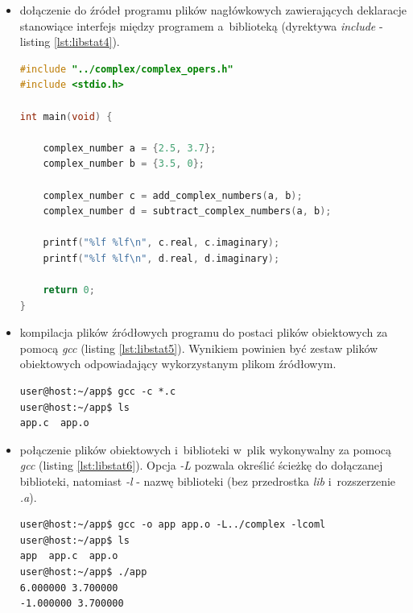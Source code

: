 \begin{itemize}
\item dołączenie do źródeł programu plików nagłówkowych zawierających deklaracje stanowiące interfejs między programem a~biblioteką (dyrektywa \textit{include} - listing \ref{lst:libstat4}).

\begin{lstlisting}[language=c++, caption={Plik \textit{app.c} zawierający dyrektywę \textit{include} dołączającą plik nagłówkowy zawierający deklaracje funkcji z~biblioteki statycznej},label={lst:libstat4}]
#include "../complex/complex_opers.h"
#include <stdio.h>

int main(void) {

    complex_number a = {2.5, 3.7};
    complex_number b = {3.5, 0};

    complex_number c = add_complex_numbers(a, b);
    complex_number d = subtract_complex_numbers(a, b);

    printf("%lf %lf\n", c.real, c.imaginary);
    printf("%lf %lf\n", d.real, d.imaginary);

    return 0;
}
\end{lstlisting}

\item kompilacja plików źródłowych programu do postaci plików obiektowych za pomocą \textit{gcc} (listing \ref{lst:libstat5}). Wynikiem powinien być zestaw plików obiektowych odpowiadający wykorzystanym plikom źródłowym.

\begin{lstlisting}[language=Cmd, caption={Kompilacja plików źródłowych głównego programu do postaci obiektowej.},label={lst:libstat5}]
user@host:~/app$ gcc -c *.c
user@host:~/app$ ls
app.c  app.o
\end{lstlisting}


\item połączenie plików obiektowych i~biblioteki w~plik wykonywalny za pomocą \textit{gcc} (listing \ref{lst:libstat6}). Opcja \textit{-L} pozwala określić ścieżkę do dołączanej biblioteki, natomiast \textit{-l} - nazwę biblioteki (bez przedrostka \textit{lib} i~rozszerzenie \textit{.a}).

\begin{lstlisting}[language=Cmd, caption={Linkowanie plików obiektowych programu z~biblioteką statyczną, wynik uruchomienia programu obrazuący poprawne działanie przykładu.},label={lst:libstat6}]
user@host:~/app$ gcc -o app app.o -L../complex -lcoml
user@host:~/app$ ls
app  app.c  app.o
user@host:~/app$ ./app
6.000000 3.700000
-1.000000 3.700000
\end{lstlisting}

\end{itemize}


